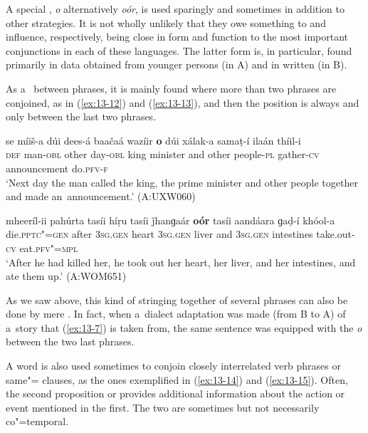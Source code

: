  A special , \textit{o} alternatively \textit{oór}, is used sparingly and sometimes in addition to other  strategies. It is not wholly unlikely that they owe something to \iliPashto and \iliUrdu influence, respectively, being close in form and function to the most important conjunctions in each of these languages. The latter form is, in particular, found primarily in data obtained from younger persons (in A) and in written  (in B). 


As a~ between  phrases, it is mainly found where more than two  phrases are conjoined, as in (\ref{ex:13-12}) and (\ref{ex:13-13}), and then the position is always and only between the last two phrases.

\ea
\label{ex:13-12}
\gll se míiš-a dúi dees-á {\ob}baačaá wazíir \textbf{o} dúi xálak-a{\cb} samaṭ-í ilaán thíil-i \\
\textsc{def} man-\textsc{obl} other day-\textsc{obl} king minister and other  people-\textsc{pl} gather-\textsc{cv} announcement do.\textsc{pfv-f}  \\
\glt `Next day the man called the king, the prime minister and other people together and made an~announcement.' (A:UXW060)

\ex
\label{ex:13-13}
\gll mheeríl-ii pahúrta {\ob}tasíi híṛu tasíi ǰhanɡaár \textbf{oór} tasíi aandáara{\cb} ɡaḍ-í khóol-a\\
die.\textsc{pptc"=gen} after \textsc{3sg.gen} heart \textsc{3sg.gen}  liver and \textsc{3sg.gen} intestines take.out-\textsc{cv} eat.\textsc{pfv"=mpl}\\
\glt `After he had killed her, he took out her heart, her liver, and her intestines, and ate them up.' (A:WOM651) 
\z

As we saw above, this kind of stringing together of several  phrases can also be done by mere . In fact, when a~dialect adaptation was made (from B to A) of a~story that (\ref{ex:13-7}) is taken from, the same sentence was equipped with the  \textit{o} between the two last  phrases. 


A  word is also used sometimes to conjoin closely interrelated verb phrases or same"= clauses, as the ones exemplified in (\ref{ex:13-14}) and (\ref{ex:13-15}). Often, the second proposition or  provides additional information about the action or event mentioned in the first. The two are sometimes but not necessarily co"=temporal.

